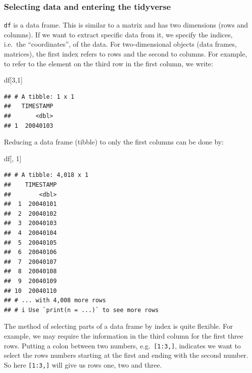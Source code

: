 \documentclass[
]{book}
\newenvironment{Shaded}{\begin{snugshade}}{\end{snugshade}}
\newcommand{\DecValTok}[1]{\textcolor[rgb]{0.00,0.00,0.81}{#1}}
\newcommand{\NormalTok}[1]{#1}
\begin{document}
\hypertarget{selecting-data-and-entering-the-tidyverse}{%
\subsubsection{Selecting data and entering the tidyverse}\label{selecting-data-and-entering-the-tidyverse}}

\texttt{df} is a data frame. This is similar to a matrix and has two dimensions (rows and columns). If we want to extract specific data from it, we specify the indices, i.e.~the ``coordinates'', of the data. For two-dimensional objects (data frames, matrices), the first index refers to rows and the second to columns. For example, to refer to the element on the third row in the first column, we write:

\begin{Shaded}
\begin{Highlighting}[]
\NormalTok{df[}\DecValTok{3}\NormalTok{,}\DecValTok{1}\NormalTok{]}
\end{Highlighting}
\end{Shaded}

\begin{verbatim}
## # A tibble: 1 x 1
##   TIMESTAMP
##       <dbl>
## 1  20040103
\end{verbatim}

Reducing a data frame (tibble) to only the first columns can be done by:

\begin{Shaded}
\begin{Highlighting}[]
\NormalTok{df[, }\DecValTok{1}\NormalTok{]}
\end{Highlighting}
\end{Shaded}

\begin{verbatim}
## # A tibble: 4,018 x 1
##    TIMESTAMP
##        <dbl>
##  1  20040101
##  2  20040102
##  3  20040103
##  4  20040104
##  5  20040105
##  6  20040106
##  7  20040107
##  8  20040108
##  9  20040109
## 10  20040110
## # ... with 4,008 more rows
## # i Use `print(n = ...)` to see more rows
\end{verbatim}

The method of selecting parts of a data frame by index is quite flexible. For example, we may require the information in the third column for the first three rows. Putting a colon between two numbers, e.g.~\texttt{{[}1:3,{]}}, indicates we want to select the rows numbers starting at the first and ending with the second number. So here \texttt{{[}1:3,{]}} will give us rows one, two and three.
\end{document}
